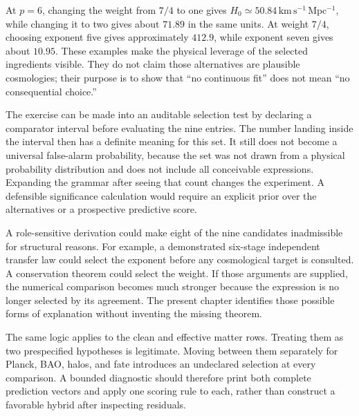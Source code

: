 At $p=6$, changing the weight from $7/4$ to one gives $H_0\simeq50.84\,\mathrm{km\,s^{-1}\,Mpc^{-1}}$, while changing it to two gives about $71.89$ in the same units. At weight $7/4$, choosing exponent five gives approximately $412.9$, while exponent seven gives about $10.95$. These examples make the physical leverage of the selected ingredients visible. They do not claim those alternatives are plausible cosmologies; their purpose is to show that ``no continuous fit'' does not mean ``no consequential choice.''

The exercise can be made into an auditable selection test by declaring a comparator interval before evaluating the nine entries. The number landing inside the interval then has a definite meaning for this set. It still does not become a universal false-alarm probability, because the set was not drawn from a physical probability distribution and does not include all conceivable expressions. Expanding the grammar after seeing that count changes the experiment. A defensible significance calculation would require an explicit prior over the alternatives or a prospective predictive score.

A role-sensitive derivation could make eight of the nine candidates inadmissible for structural reasons. For example, a demonstrated six-stage independent transfer law could select the exponent before any cosmological target is consulted. A conservation theorem could select the weight. If those arguments are supplied, the numerical comparison becomes much stronger because the expression is no longer selected by its agreement. The present chapter identifies those possible forms of explanation without inventing the missing theorem.

The same logic applies to the clean and effective matter rows. Treating them as two prespecified hypotheses is legitimate. Moving between them separately for Planck, BAO, halos, and fate introduces an undeclared selection at every comparison. A bounded diagnostic should therefore print both complete prediction vectors and apply one scoring rule to each, rather than construct a favorable hybrid after inspecting residuals.

